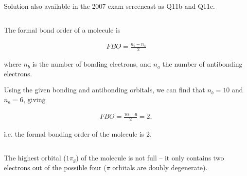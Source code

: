 Solution also available in the 2007 exam screencast as Q11b and Q11c.

\subsection{}

The formal bond order of a molecule is

\begin{align*}
  FBO = \frac{n_b - n_a}{2}
\end{align*}

where $n_b$ is the number of bonding electrons, and $n_a$ the number of antibonding electrons.

Using the given bonding and antibonding orbitals, we can find that $n_b = 10$ and $n_a = 6$, giving

\begin{align*}
  FBO = \frac{10-6}{2} = 2,
\end{align*}

i.e. the formal bonding order of the molecule is 2.

\subsection{}

The highest orbital ($1\pi_g$) of the molecule is not full -- it only contains two electrons out of the possible four ($\pi$ orbitals are doubly degenerate).
